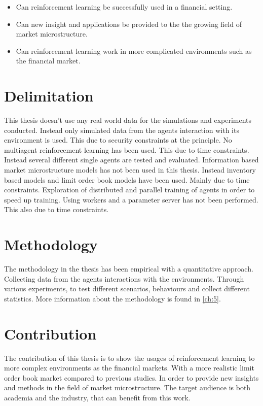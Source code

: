 \documentclass{kththesis}
\theoremstyle{definition}
\begin{document}
\begin{itemize}
    \item Can reinforcement learning be successfully used in a financial setting. 
    \item Can new insight and applications be provided to the the growing field of market microstructure. 
    \item Can reinforcement learning work in more complicated environments such as the financial market.
\end{itemize}


\section{Delimitation}
This thesis doesn't use any real world data for the simulations and experiments conducted. Instead only simulated data from the agents interaction with its environment is used. This due to security constraints at the principle. No multiagent reinforcement learning has been used. This due to time constraints. Instead several different single agents are tested and evaluated. 
\newline
\newline
Information based market microstructure models has not been used in this thesis. Instead inventory based models and limit order book models have been used. Mainly due to time constraints. Exploration of distributed and parallel training of agents in order to speed up training. Using workers and a parameter server has not been performed. This also due to time constraints.

\section{Methodology}
The methodology in the thesis has been empirical with a quantitative approach. Collecting data from the agents interactions with the environments. Through various experiments, to test different scenarios, behaviours and collect different statistics. More information about the methodology is found in \autoref{ch:5}.


\section{Contribution}
The contribution of this thesis is to show the usages of reinforcement learning to more complex environments as the financial markets. With a more realistic limit order book market compared to previous studies. In order to provide new insights and methods in the field of market microstructure. The target audience is both academia and the industry, that can benefit from this work.
\end{document}
